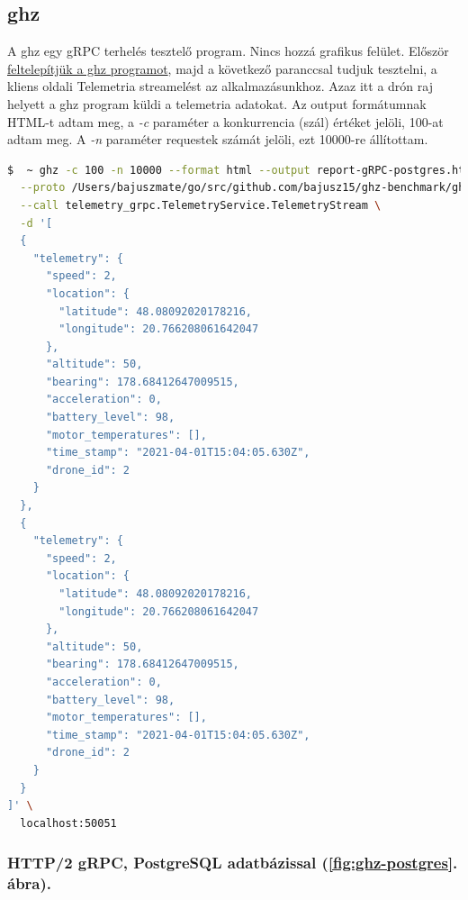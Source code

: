 \subsection{ghz}
A ghz egy gRPC terhelés tesztelő program. Nincs hozzá grafikus felület.
Először \href{https://github.com/bojand/ghz}{feltelepítjük a ghz programot}, majd a következő paranccsal tudjuk tesztelni, a kliens oldali Telemetria streamelést az alkalmazásunkhoz.
Azaz itt a drón raj helyett a ghz program küldi a telemetria adatokat.
Az output formátumnak HTML-t adtam meg, a \textit{-c} paraméter a konkurrencia (szál) értéket jelöli, 100-at adtam meg.
A \textit{-n} paraméter requestek számát jelöli, ezt 10000-re állítottam.

\begin{lstlisting}[language=bash]
  $  ~ ghz -c 100 -n 10000 --format html --output report-gRPC-postgres.html  --insecure \
  --proto /Users/bajuszmate/go/src/github.com/bajusz15/ghz-benchmark/ghz/cmd/benchmark/protobuf/telemetry.proto \
  --call telemetry_grpc.TelemetryService.TelemetryStream \
  -d '[
  {
    "telemetry": {
      "speed": 2,
      "location": {
        "latitude": 48.08092020178216,
        "longitude": 20.766208061642047
      },
      "altitude": 50,
      "bearing": 178.68412647009515,
      "acceleration": 0,
      "battery_level": 98,
      "motor_temperatures": [],
      "time_stamp": "2021-04-01T15:04:05.630Z",
      "drone_id": 2
    }
  },
  {
    "telemetry": {
      "speed": 2,
      "location": {
        "latitude": 48.08092020178216,
        "longitude": 20.766208061642047
      },
      "altitude": 50,
      "bearing": 178.68412647009515,
      "acceleration": 0,
      "battery_level": 98,
      "motor_temperatures": [],
      "time_stamp": "2021-04-01T15:04:05.630Z",
      "drone_id": 2
    }
  }
]' \
  localhost:50051
\end{lstlisting}

\subsubsection{HTTP/2 gRPC, PostgreSQL adatbázissal (\ref{fig:ghz-postgres}. ábra).}

